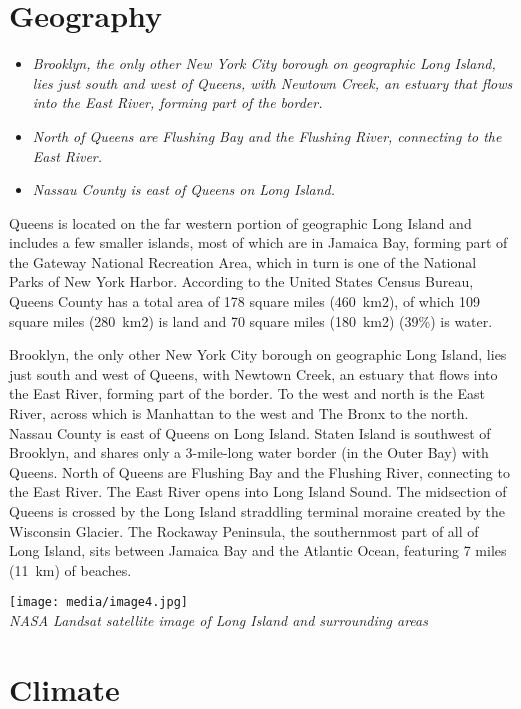 \section{Geography}\label{geography}

\begin{itemize}
\item
  \emph{Brooklyn, the only other New York City borough on geographic
  Long Island, lies just south and west of Queens, with Newtown Creek,
  an estuary that flows into the East River, forming part of the
  border.}
\item
  \emph{North of Queens are Flushing Bay and the Flushing River,
  connecting to the East River.}
\item
  \emph{Nassau County is east of Queens on Long Island.}
\end{itemize}

Queens is located on the far western portion of geographic Long Island
and includes a few smaller islands, most of which are in Jamaica Bay,
forming part of the Gateway National Recreation Area, which in turn is
one of the National Parks of New York Harbor. According to the United
States Census Bureau, Queens County has a total area of 178 square miles
(460~km2), of which 109 square miles (280~km2) is land and 70 square
miles (180~km2) (39\%) is water.

Brooklyn, the only other New York City borough on geographic Long
Island, lies just south and west of Queens, with Newtown Creek, an
estuary that flows into the East River, forming part of the border. To
the west and north is the East River, across which is Manhattan to the
west and The Bronx to the north. Nassau County is east of Queens on Long
Island. Staten Island is southwest of Brooklyn, and shares only a
3-mile-long water border (in the Outer Bay) with Queens. North of Queens
are Flushing Bay and the Flushing River, connecting to the East River.
The East River opens into Long Island Sound. The midsection of Queens is
crossed by the Long Island straddling terminal moraine created by the
Wisconsin Glacier. The Rockaway Peninsula, the southernmost part of all
of Long Island, sits between Jamaica Bay and the Atlantic Ocean,
featuring 7 miles (11~km) of beaches.

\texttt{[image: media/image4.jpg]}\\
\emph{NASA Landsat satellite image of Long Island and surrounding areas}

\section{Climate}\label{climate}

